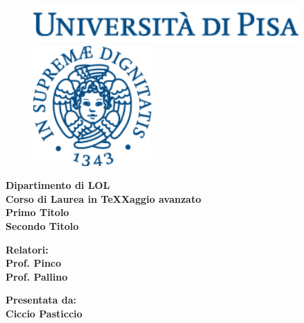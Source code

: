 \begin{titlepage} %
\begin{figure}[t] %
	\centering\includegraphics[width=0.9\textwidth]{testimages/scritta.png}
    \centering\includegraphics[width=0.4\textwidth]{testimages/logo.png}
\end{figure}
\begin{center}
	\textbf{ Dipartimento di LOL\\ Corso di Laurea in TeXXaggio avanzato\\}
	\vspace{15mm}
    {\LARGE{\bf Primo Titolo}}\\
	\vspace{3mm}
	{\LARGE{\bf Secondo Titolo}}\\
\end{center}

\vspace{36mm}
\begin{minipage}[t]{0.47\textwidth}
	{\large{\bf Relatori:\\ Prof. Pinco\\ Prof. Pallino}}
\end{minipage}
\hfill
\begin{minipage}[t]{0.47\textwidth}\raggedleft
	{\large{\bf Presentata da: \\ Ciccio Pasticcio\\ }}
\end{minipage}

\vspace{18mm}


\end{titlepage}